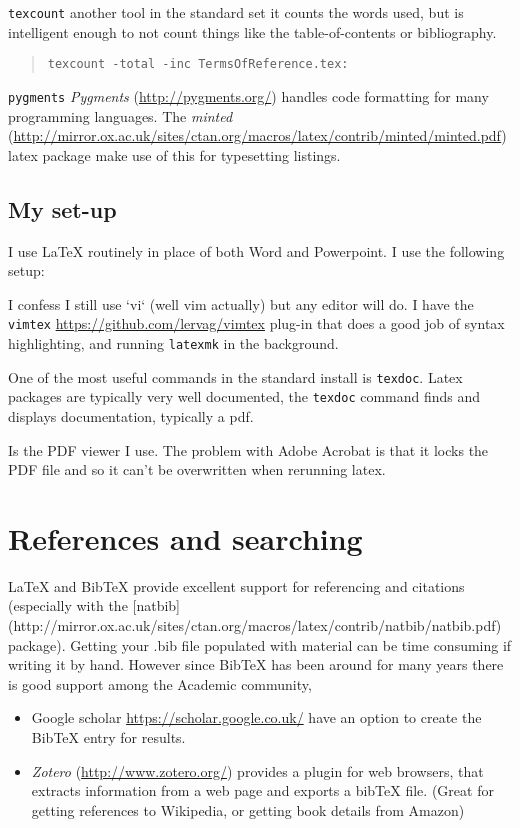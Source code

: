\documentclass{tufte-handout}
\begin{document}
\texttt{texcount}
another tool in the  standard set it counts the words used, but is
intelligent enough to not count things like the table-of-contents or
bibliography.
\begin{quote}
	\texttt{texcount -total -inc TermsOfReference.tex: }
\end{quote}

\texttt{pygments}
 \emph{Pygments} (\url{http://pygments.org/}) handles code formatting for many
programming languages.   The
\emph{minted} (\url{http://mirror.ox.ac.uk/sites/ctan.org/macros/latex/contrib/minted/minted.pdf})
latex package make use of this for typesetting listings.


\subsection{My set-up}
I use LaTeX routinely in place of both Word and Powerpoint.  I use the
following setup:

I confess I still use `vi` (well vim actually)  but any editor will do.
I have the \texttt{vimtex} \url{https://github.com/lervag/vimtex} plug-in that 
does a good job of syntax highlighting, and running \texttt{latexmk} in the
background. 

One of the most useful commands in the standard install is \texttt{texdoc}.   
Latex packages are typically very well documented, the \texttt{texdoc} command
finds and displays documentation, typically a pdf.

Is the PDF viewer I use.  The problem with Adobe Acrobat is that it locks the
PDF file and so it can't be overwritten when rerunning latex.


\section{References and searching}
LaTeX and BibTeX provide excellent support for referencing and citations
 (especially with the
 [natbib](http://mirror.ox.ac.uk/sites/ctan.org/macros/latex/contrib/natbib/natbib.pdf) package).
 Getting your .bib file populated with material can be time consuming if writing it by hand.
 However since BibTeX has been around for many years there is good support among the 
 Academic community, 

 \begin{itemize}
	 \item Google scholar \url{https://scholar.google.co.uk/}
   have an option to create the BibTeX entry for results.
\item \emph{Zotero} (\url{http://www.zotero.org/}) provides a plugin for web browsers,
   that extracts information from a web page and exports a bibTeX file.  
   (Great for getting references to Wikipedia, or getting book details from Amazon)
   \end{itemize}
\end{document}
